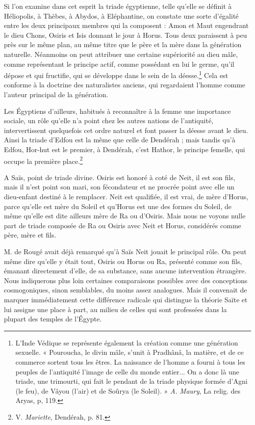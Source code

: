 \documentclass[letterpaper,twocolumn,openany,nodeprecatedcode]{dndbook}
\begin{document}
Si l'on examine dans cet esprit la triade égyptienne, telle qu'elle se définit à Héliopolis, à Thèbes, à Abydos, à Eléphantine, on constate une sorte d'égalité entre les deux principaux membres qui la composent : Amon et Maut engendrant le dieu Chons, Osiris et Isis donnant le jour à Horus. Tous deux paraissent à peu près sur le même plan, au même titre que le père et la mère dans la génération naturelle. Néanmoins on peut attribuer une certaine supériorité au dieu mâle, comme représentant le principe actif, comme possédant en lui le germe, qu'il dépose et qui fructifie, qui se développe dans le sein de la déesse.\footnote{L'Inde Védique se représente également la création comme une génération sexuelle. « Pouroucha, le divin mâle, s'unit à Pradhânâ, la matière, et de ce commerce sortent tous les êtres. La naissance de l'homme a fourni à tous les peuples de l'antiquité l'image de celle du monde entier... On a donc là une triade, une trimourti, qui fait le pendant de la triade physique formée d'Agni (le feu), de Vâyou (l'air) et de Soûrya (le Soleil). » \emph{A. Maury}, La relig. des Aryas, p, 119.} Cela est conforme à la doctrine des naturalistes anciens, qui regardaient l'homme comme l'auteur principal de la génération.

Les Égyptiens d'ailleurs, habitués à reconnaître à la femme une importance sociale, un rôle qu'elle n'a point chez les autres nations de l'antiquité, intervertissent quelquefois cet ordre naturel et font passer la déesse avant le dieu. Ainsi la triade d'Edfou est la même que celle de Dendérah ; mais tandis qu'à Edfou, Hor-hut est le premier, à Dendérah, c'est Hathor, le principe femelle, qui occupe la première place.\footnote{V. \emph{Mariette}, Dendérah, p. 81.}

A Saïs, point de triade divine. Osiris est honoré à coté de Neit, il est son fils, mais il n'est point son mari, son fécondateur et ne procrée point avec elle un dieu-enfant destiné à le remplacer. Neit est qualifiée, il est vrai, de mère d'Horus, parce qu’elle est mère du Soleil et qu'Horus est une des formes du Soleil, de même qu'elle est dite ailleurs mère de Ra ou d'Osiris. Mais nous ne voyons nulle part de triade composée de Ra ou Osiris avec Neit et Horus, considérés comme père, mère et fils.

M. de Rougé avait déjà remarqué qu'à Saïs Neit jouait le principal rôle. On peut même dire qu'elle y était tout, Osiris ou Horus ou Ra, présenté comme son fils, émanant directement d'elle, de sa substance, sans aucune intervention étrangère. Nous indiquerons plus loin certaines comparaisons possibles avec des conceptions cosmogoniques, sinon semblables, du moins assez analogues. Mais il convenait de marquer immédiatement cette différence radicale qui distingue la théorie Saïte et lui assigne une place à part, au milieu de celles qui sont professées dans la plupart des temples de l'Égypte.
\end{document}
